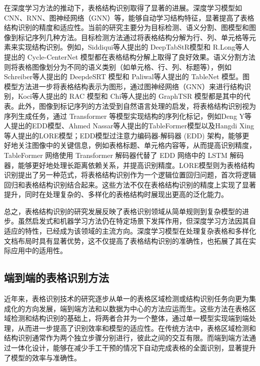 \documentclass[UTF8,12pt, AutoFakeBold,fontset = founder]{ctexart}
\begin{document}
在深度学习方法的推动下，表格结构识别取得了显著的进展。深度学习模型如 CNN、RNN、图神经网络（GNN）等，能够自动学习结构特征，显著提高了表格结构识别的精度和适应性。当前的研究主要分为目标检测、语义分割、图模型和图像到标记序列几种方法。目标检测方法通过将表格结构分解为行、列、单元格等元素来实现结构识别。例如，Siddiqui\cite{m21}等人提出的 DeepTabStR模型和 R.Long\cite{m22}等人提出的 Cycle-CenterNet 模型都在表格结构分解上取得了良好效果。语义分割方法则将表格图像划分为不同的语义类别（如单元格、行、列、标题等），例如 Schreiber\cite{m12}等人提出的 DeepdeSRT 模型和 Paliwal\cite{m17}等人提出的 TableNet 模型。图模型方法进一步将表格结构表示为图形，通过图神经网络（GNN）来进行结构识别，Koci\cite{m7}等人提出的 RAC 模型和 Chi\cite{m8}等人提出的 GraphTSR 模型都是其中的代表。此外，图像到标记序列的方法受到自然语言处理的启发，将表格结构识别视为序列生成任务，通过 Transformer 等模型实现结构的序列化标记，例如Deng Y\cite{m10}等人提出的EDD模型、Ahmed Nassar\cite{m8}等人提出的TableFormer模型以及Hangdi Xing\cite{m23}等人提出的LORE模型；EDD模型过注意力编码器-解码器 (EDD) 架构，能够更好地关注图像中的关键信息，例如表格标题、单元格内容等，从而提高识别精度，TableFormer 网络使用 Transformer 解码器代替了 EDD 网络中的 LSTM 解码器，能够更好地处理长距离依赖关系，并提高识别精度。LORE模型则为表格结构识别提出了另一种范式，将表格结构识别作为一个逻辑位置回归问题，首次将逻辑回归和表格结构识别结合起来。这些方法不仅在表格结构识别的精度上实现了显著提升，同时在处理复杂的、多样化的表格结构时展现出更高的泛化能力。

总之，表格结构识别的研究发展反映了表格识别领域从简单规则到复杂模型的进步。虽然启发式和机器学习方法仍在特定场景下发挥作用，但深度学习方法因其自适应的特性，已经成为该领域的主流方向。深度学习模型在处理复杂表格和多样化文档布局时具有显著优势，这不仅提高了表格结构识别的准确性，也拓展了其在实际应用中的适用性。

\subsection{端到端的表格识别方法}

近年来，表格识别技术的研究逐步从单一的表格区域检测或结构识别任务向更为集成化的方向发展，端到端方法和以数据为中心的方法应运而生。这些方法在表格区域检测和结构识别的基础上，将两者合并为一个整体，通过单一模型实现端到端处理，从而进一步提高了识别效率和模型的适应性。在传统方法中，表格区域检测和结构识别通常作为两个独立步骤分别进行，彼此之间的交互有限。而端到端方法通过一体化设计，能够在减少手工干预的情况下自动完成表格的全面识别，显著提升了模型的效率与准确性。
\end{document}
